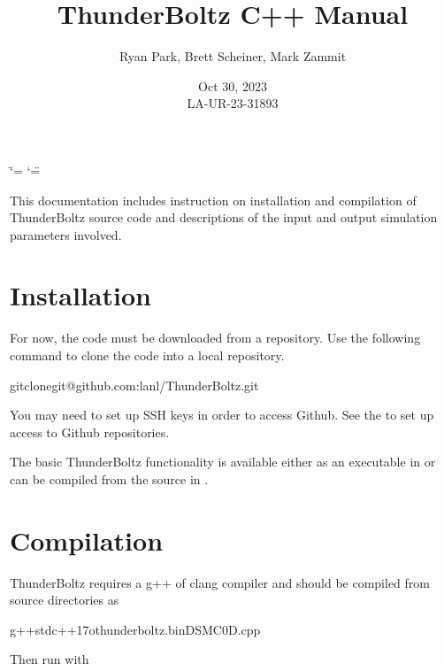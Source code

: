 \documentclass[letterpaper,10pt,english,openany,oneside]{sphinxmanual}
\title{ThunderBoltz C++ Manual}
\date{Oct 30, 2023\\LA-UR-23-31893}
\author{Ryan Park, Brett Scheiner, Mark Zammit}
\affil{Los Alamos National Laboratory, Los Alamos, NM, 87545}
\begin{document}
\ifdefined\shorthandoff
  \ifnum\catcode`\=\string=\active\shorthandoff{=}\fi
  \ifnum\catcode`\"=\active{}\fi
\fi

\pagestyle{empty}
\sphinxmaketitle
\pagestyle{plain}
\sphinxtableofcontents
\pagestyle{normal}
\label{\detokenize{short_index::doc}}


\sphinxAtStartPar
This documentation includes instruction on installation
and compilation of ThunderBoltz source code and descriptions
of the input and output simulation parameters involved.


\chapter{Installation}
\label{\detokenize{short_index:installation}}
\sphinxAtStartPar
For now, the code must be downloaded from a repository.
Use the following command to clone the code into a local repository.

\begin{sphinxVerbatim}[commandchars=\\\{\}]
gitclonegit@github.com:lanl/ThunderBoltz.git
\end{sphinxVerbatim}

\sphinxAtStartPar
You may need to set up SSH keys in order to access Github. See the
to set up access to Github repositories.

\sphinxAtStartPar
The basic ThunderBoltz functionality is available either
as an executable in  or can be compiled from the
source in .

\chapter{Compilation}
\label{\detokenize{short_index:compilation}}
\sphinxAtStartPar
ThunderBoltz requires a g++ of clang compiler and should be compiled
from source directories as

\begin{sphinxVerbatim}[commandchars=\\\{\}]
g++\PYGZhy{}stdc++17\PYGZhy{}othunderboltz.binDSMC0D.cpp
\end{sphinxVerbatim}

\sphinxAtStartPar
Then run with
\end{document}
